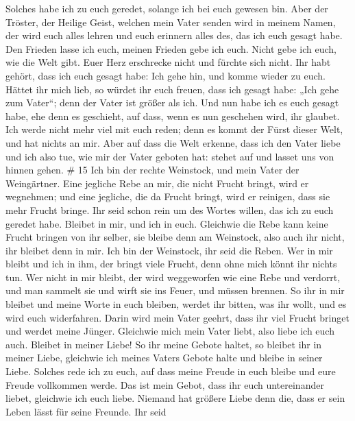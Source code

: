 Solches habe ich zu euch geredet, solange ich bei euch gewesen bin.
 Aber der Tröster, der Heilige Geist, welchen mein Vater
senden wird in meinem Namen, der wird euch alles lehren und euch
erinnern alles des, das ich euch gesagt habe.  Den Frieden
lasse ich euch, meinen Frieden gebe ich euch. Nicht gebe ich euch, wie
die Welt gibt. Euer Herz erschrecke nicht und fürchte sich nicht.
 Ihr habt gehört, dass ich euch gesagt habe: Ich gehe hin,
und komme wieder zu euch. Hättet ihr mich lieb, so würdet ihr euch
freuen, dass ich gesagt habe: „Ich gehe zum Vater``; denn der Vater ist
größer als ich.  Und nun habe ich es euch gesagt habe, ehe
denn es geschieht, auf dass, wenn es nun geschehen wird, ihr glaubet.
 Ich werde nicht mehr viel mit euch reden; denn es kommt
der Fürst dieser Welt, und hat nichts an mir.  Aber auf
dass die Welt erkenne, dass ich den Vater liebe und ich also tue, wie
mir der Vater geboten hat: stehet auf und lasset uns von hinnen gehen.
\# 15  Ich bin der rechte Weinstock, und mein Vater der
Weingärtner.  Eine jegliche Rebe an mir, die nicht Frucht
bringt, wird er wegnehmen; und eine jegliche, die da Frucht bringt, wird
er reinigen, dass sie mehr Frucht bringe.  Ihr seid schon
rein um des Wortes willen, das ich zu euch geredet habe. 
Bleibet in mir, und ich in euch. Gleichwie die Rebe kann keine Frucht
bringen von ihr selber, sie bleibe denn am Weinstock, also auch ihr
nicht, ihr bleibet denn in mir.  Ich bin der Weinstock, ihr
seid die Reben. Wer in mir bleibt und ich in ihm, der bringt viele
Frucht, denn ohne mich könnt ihr nichts tun.  Wer nicht in
mir bleibt, der wird weggeworfen wie eine Rebe und verdorrt, und man
sammelt sie und wirft sie ins Feuer, und müssen brennen.  So
ihr in mir bleibet und meine Worte in euch bleiben, werdet ihr bitten,
was ihr wollt, und es wird euch widerfahren.  Darin wird
mein Vater geehrt, dass ihr viel Frucht bringet und werdet meine Jünger.
 Gleichwie mich mein Vater liebt, also liebe ich euch auch.
Bleibet in meiner Liebe!  So ihr meine Gebote haltet, so
bleibet ihr in meiner Liebe, gleichwie ich meines Vaters Gebote halte
und bleibe in seiner Liebe.  Solches rede ich zu euch, auf
dass meine Freude in euch bleibe und eure Freude vollkommen werde.
 Das ist mein Gebot, dass ihr euch untereinander liebet,
gleichwie ich euch liebe.  Niemand hat größere Liebe denn
die, dass er sein Leben lässt für seine Freunde.  Ihr seid
